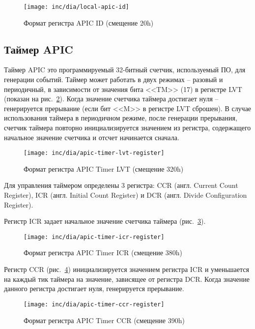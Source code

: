 \begin{figure}[ht!]
  \centering
  \texttt{[image: inc/dia/local-apic-id]}
  \caption{Формат регистра APIC ID (смещение 20h)}
  \label{fig:local-apic-id}
\end{figure}

\subsection{Таймер APIC}
Таймер APIC это программируемый 32-битный счетчик, используемый ПО, для генерации событий.
Таймер может работать в двух режимах -- разовый и периодичный, в зависимости от значения бита <<TM>> (17)
в регистре LVT (показан на рис.~\ref{fig:apic-timer-lvt-register}). Когда значение счетчика таймера
достигает нуля -- генерируется прерывание (если бит <<M>> в регистре LVT сброшен). В случае использования
таймера в периодичном режиме, после генерации прерывания, счетчик таймера повторно инициализируется
значением из регистра, содержащего начальное значение счетчика и отсчет начинается сначала.

\begin{figure}[ht!]
  \centering
  \texttt{[image: inc/dia/apic-timer-lvt-register]}
  \caption{Формат регистра APIC Timer LVT (смещение 320h)}
  \label{fig:apic-timer-lvt-register}
\end{figure}

Для управления таймером определены 3 регистра: CCR (англ. Current Count Register),
ICR (англ. Initial Count Register) и DCR (англ. Divide Configuration Register).

Регистр ICR задает начальное значение счетчика таймера (рис.~\ref{fig:apic-timer-icr-register}).
\begin{figure}[ht!]
  \centering
  \texttt{[image: inc/dia/apic-timer-icr-register]}
  \caption{Формат регистра APIC Timer ICR (смещение 380h)}
  \label{fig:apic-timer-icr-register}
\end{figure}

Регистр CCR (рис.~\ref{fig:apic-timer-ccr-register}) инициализируется значением регистра ICR и
уменьшается на каждый тик таймера на значение, зависящее от регистра DCR. Когда значение
данного регистра достигает нуля, генерируется прерывание.
\begin{figure}[ht!]
  \centering
  \texttt{[image: inc/dia/apic-timer-ccr-register]}
  \caption{Формат регистра APIC Timer CCR (смещение 390h)}
  \label{fig:apic-timer-ccr-register}
\end{figure}

